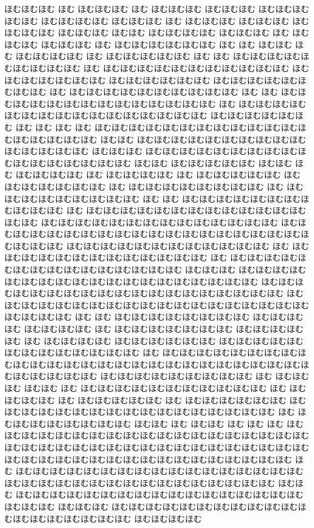 \documentclass[a4paper]{article}
\begin{document}
\begin{prochomuhomu}{\NabeAzz}
ほむほむほむ ほむ ほむほむほむ ほむ ほむほむほむ
ほむほむほむ ほむほむほむ ほむほむ ほむほむほむほむ ほむほむほむ ほむ ほむほむほむ ほむほむほむ ほむ
ほむほむほむ ほむほむほむ ほむほむ ほむほむほむほむ ほむほむほむ ほむ ほむほむほむ ほむほむほむ ほむ ほむほむほむほむほむほむ ほむ
ほむ ほむほむ ほむ ほむほむほむほむ ほむ ほむほむほむほむほむ ほむ ほむ ほむほむほむほむほむほむほむほむほむ ほむ ほむほむほむほむほむほむほむほむほむほむほむ ほむほむほむほむほむほむほむ ほむほむほむほむほむほむ ほむほむほむほむほむほむほむほむ ほむ ほむほむほむほむほむほむほむほむほむほむ ほむ ほむ ほむほむほむほむほむほむほむほむほむほむほむほむほむほむ ほむ ほむほむほむほむほむほむほむほむほむほむほむほむほむほむほむほむ ほむほむほむほむほむほむ ほむ ほむ ほむ ほむ ほむほむほむほむほむほむほむほむほむほむほむほむほむほむほむほむほむほむ ほむほむ ほむほむほむほむほむほむほむほむほむほむほむほむほむほむほむ ほむほむほむ ほむほむほむほむほむほむほむほむほむほむほむほむほむほむほむほむほむ ほむほむ ほむほむほむほむほむ ほむほむ ほむ ほむほむほむほむ ほむ ほむほむほむほむ ほむ ほむほむほむほむほむ ほむ ほむほむほむほむほむほむ ほむ ほむほむほむほむほむほむほむほむ ほむ ほむほむほむほむほむほむほむほむほむ ほむ ほむ ほむほむほむほむほむほむほむほむほむほむほむ ほむ ほむほむほむほむほむほむほむほむほむほむほむほむほむほむほむ ほむほむほむほむほむほむほむほむほむほむほむほむほむほむ ほむほむほむほむほむほむほむほむほむほむほむほむほむほむほむほむほむほむほむほむほむほむほむ ほむほむほむほむほむほむほむほむほむほむほむほむ ほむ ほむほむほむほむほむほむほむほむほむほむほむほむほむ ほむ ほむほむほむほむほむほむほむほむほむほむほむほむほむほむほむ ほむほむほむ ほむほむほむほむほむほむほむほむほむほむほむほむほむほむほむほむほむほむほむ ほむほむほむほむほむほむほむほむほむほむほむほむほむほむほむほむほむほむほむ ほむ ほむほむほむほむほむほむほむほむほむほむほむほむほむほむほむほむほむほむ ほむほむほむほむ ほむ ほむ ほむほむほむほむほむほむほむほむ ほむほむほむ ほむ ほむほむほむほむ ほむ ほむほむほむほむほむほむほむ ほむほむほむほむほむ ほむ ほむほむほむほむ ほむほむほむほむほむほむ ほむほむほむほむほむ ほむほむほむほむほむほむほむほむ ほむ ほむほむほむほむほむほむほむほむほむほむほむほむほむほむほむほむほむほむほむほむほむほむほむほむほむほむほむほむほむほむほむほむ ほむほむほむほむほむほむほむほむほむ ほむ ほむほむほむ ほむほむ ほむ ほむほむほむほむほむほむほむほむほむほむほむ ほむ ほむほむほむほむ ほむ ほむほむほむほむほむ ほむ ほむほむほむほむほむほむ ほむ ほむほむほむほむほむほむほむほむほむほむほむほむほむほむほむほむ ほむ ほむほむほむほむほむほむほむほむ ほむほむ ほむ ほむほむ ほむ ほむ ほむ ほむほむほむほむほむほむほむほむほむほむほむほむほむほむほむほむほむほむほむほむほむほむほむほむほむほむほむほむほむほむほむほむほむほむほむほむほむほむほむほむほむほむほむほむほむほむほむほむほむほむほむほむほむほむ ほむ ほむほむほむほむほむほむほむほむほむほむほむほむほむほむほむほむほむほむほむほむほむほむほむほむほむほむほむほむほむほむほむほむほむ ほむほむ ほむほむほむほむほむほむほむほむほむほむほむほむほむほむほむほむほむほむほむほむ ほむほむほむ ほむほむほむほむほむほむほむほむほむほむほむほむほむほむほむほむほむほむほむ ほむほむほむほむ 
\end{prochomuhomu}
\end{document}
